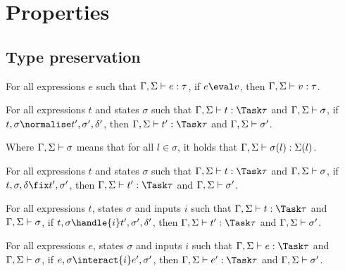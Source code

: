 
\section{Properties}
\label{sec:properties}


\subsection{Type preservation}
\label{sub:preservation}

\begin{theorem}
  For all expressions $e$
  such that $\Gamma,\Sigma \vdash e:\tau$,
  if $e\eval v$,
  then $\Gamma,\Sigma \vdash v:\tau$.
  \label{thm:pres-eval}
\end{theorem}



\begin{theorem}
  For all expressions $t$ and states $\sigma$
  such that $\Gamma,\Sigma \infers t:\Task\tau$ and $\Gamma,\Sigma \vdash \sigma$,
  if $t,\sigma \normalise t',\sigma',\delta'$,
  then $\Gamma,\Sigma \infers t':\Task\tau$ and $\Gamma,\Sigma \vdash \sigma'$.
  \label{thm:pres-norm}
\end{theorem}

\noindent
Where $\Gamma,\Sigma \vdash \sigma$ means that for all $l\in \sigma$, it holds that
$\Gamma,\Sigma\vdash \sigma(l):\Sigma(l)$.


\begin{theorem}
  For all expressions $t$ and states $\sigma$
  such that $\Gamma,\Sigma \infers t:\Task\tau$ and $\Gamma,\Sigma \vdash \sigma$,
  if $t,\sigma,\delta \fix t',\sigma'$,
  then $\Gamma,\Sigma \infers t':\Task\tau$ and $\Gamma,\Sigma \vdash \sigma'$.
  \label{thm:pres-fix}
\end{theorem}

\begin{theorem}
  For all expressions $t$, states $\sigma$ and inputs $i$
  such that $\Gamma,\Sigma \infers t:\Task\tau$ and $\Gamma,\Sigma \vdash \sigma$,
  if $ t,\sigma \handle{i} t',\sigma',\delta'$,
  then $\Gamma,\Sigma\infers t':\Task\tau$ and $\Gamma,\Sigma\vdash \sigma'$.
  \label{thm:pres-handle}
\end{theorem}

\begin{theorem}
  For all expressions $e$, states $\sigma$ and inputs $i$
  such that $\Gamma,\Sigma \infers e:\Task\tau$ and $\Gamma,\Sigma \vdash \sigma$,
  if $ e,\sigma \interact{i} e',\sigma'$,
  then $\Gamma,\Sigma\infers e':\Task\tau$ and $\Gamma,\Sigma\vdash \sigma'$.
  \label{thm:pres-interaction}
\end{theorem}

